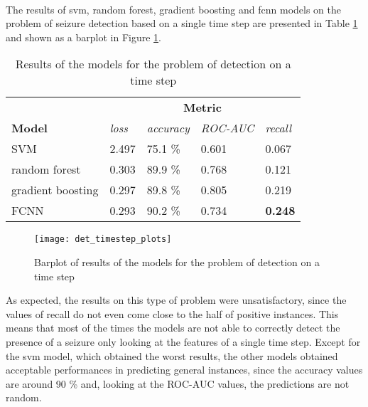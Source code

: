 \paragraph{} The results of \acs{svm}, random forest, gradient boosting and \acs{fcnn} models on the problem of seizure detection based on a single time step are presented in Table \ref{tab:det_timestep_results} and shown as a barplot in Figure \ref{fig:det_timestep_plots}.
\begin{table}[b]
    \centering
    \begin{tabular}{lllll}
        \hline
                          & \multicolumn{4}{c}{\textbf{Metric}}                                    \\ \cline{2-5} 
        \textbf{Model}    & \textit{loss} & \textit{accuracy} & \textit{ROC-AUC} & \textit{recall} \\ \hline
        SVM               & 2.497         & 75.1 \%           & 0.601            & 0.067           \\
        random forest     & 0.303         & 89.9 \%           & 0.768            & 0.121           \\
        gradient boosting & 0.297         & 89.8 \%           & 0.805            & 0.219           \\
        FCNN              & 0.293         & 90.2 \%           & 0.734            & \textbf{0.248}  \\\hline
    \end{tabular}
    \caption{Results of the models for the problem of detection on a time step}
    \label{tab:det_timestep_results}
\end{table}

\begin{figure}[t]
    \centering
    \texttt{[image: det\_timestep\_plots]}
    \caption{Barplot of results of the models for the problem of detection on a time step}
    \label{fig:det_timestep_plots}
\end{figure}

As expected, the results on this type of problem were unsatisfactory, since the values of recall do not even come close to the half of positive instances. This means that most of the times the models are not able to correctly detect the presence of a seizure only looking at the features of a single time step. Except for the \acs{svm} model, which obtained the worst results, the other models obtained acceptable performances in predicting general instances, since the accuracy values are around 90 \% and, looking at the ROC-AUC values, the predictions are not random.

